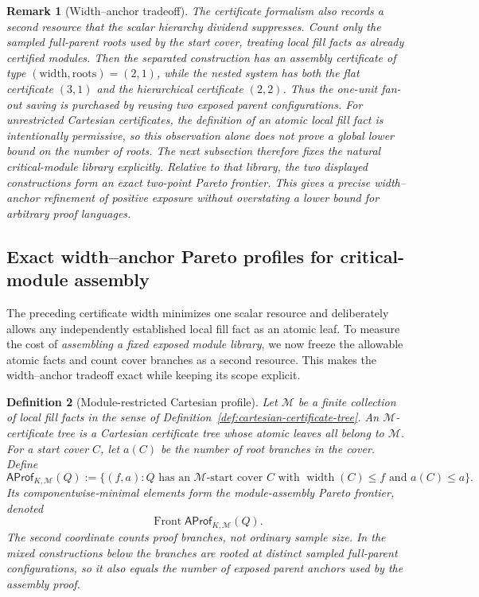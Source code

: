 \documentclass[11pt]{article}
\newtheorem{definition}{Definition}[section]
\newtheorem{remark}[definition]{Remark}
\newcommand{\Front}{\operatorname{Front}}
\begin{document}
\begin{remark}[Width--anchor tradeoff]
The certificate formalism also records a second resource that the scalar
hierarchy dividend suppresses.  Count only the sampled full-parent roots used
by the start cover, treating local fill facts as already certified modules.
Then the separated construction has an assembly certificate of type
$(\text{width},\text{roots})=(2,1)$, while the nested system has both the flat
certificate $(3,1)$ and the hierarchical certificate $(2,2)$.  Thus the
one-unit fan-out saving is purchased by reusing two exposed parent
configurations.  For unrestricted Cartesian certificates, the definition of an atomic local fill
fact is intentionally permissive, so this observation alone does not prove a
global lower bound on the number of roots.  The next subsection therefore
fixes the natural critical-module library explicitly.  Relative to that library,
the two displayed constructions form an exact two-point Pareto frontier.  This
gives a precise width--anchor refinement of positive exposure without
overstating a lower bound for arbitrary proof languages.
\end{remark}


\subsection{Exact width--anchor Pareto profiles for critical-module assembly}
\label{subsec:width-anchor-pareto}

The preceding certificate width minimizes one scalar resource and deliberately
allows any independently established local fill fact as an atomic leaf.  To
measure the cost of \emph{assembling a fixed exposed module library}, we now
freeze the allowable atomic facts and count cover branches as a second
resource.  This makes the width--anchor tradeoff exact while keeping its scope
explicit.

\begin{definition}[Module-restricted Cartesian profile]
\label{def:module-restricted-profile}
Let $\mathcal M$ be a finite collection of local fill facts in the sense of
Definition~\ref{def:cartesian-certificate-tree}.  An
$\mathcal M$-\emph{certificate tree} is a Cartesian certificate tree whose
atomic leaves all belong to $\mathcal M$.  For a start cover $C$, let
$a(C)$ be the number of root branches in the cover.  Define
\[
 \mathsf{AProf}_{K,\mathcal M}(Q)
 :=\bigl\{(f,a):
       \text{$Q$ has an $\mathcal M$-start cover $C$ with
       $\operatorname{width}(C)\le f$ and $a(C)\le a$}\bigr\}.
\]
Its componentwise-minimal elements form the
\emph{module-assembly Pareto frontier}, denoted
\[
  \Front\mathsf{AProf}_{K,\mathcal M}(Q).
\]
The second coordinate counts proof branches, not ordinary sample size.  In the
mixed constructions below the branches are rooted at distinct sampled
full-parent configurations, so it also equals the number of exposed parent
anchors used by the assembly proof.
\end{definition}
\end{document}
